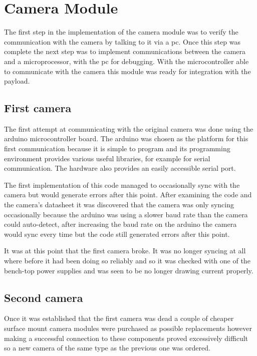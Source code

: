 \section{Camera Module}
\label{sec:John_Implementation}

The first step in the implementation of the camera module was to verify the communication with the camera by talking to it via a pc. Once this step was complete the next step was to implement communications between the camera and a microprocessor, with the pc for debugging. With the microcontroller able to communicate with the camera this module was ready for integration with the payload.

\subsection{First camera}

The first attempt at communicating with the original camera was done using the arduino microcontroller board. The arduino was chosen as the platform for this first communication because it is simple to program and its programming environment provides various useful libraries, for example for serial communication. The hardware also provides an easily accessible serial port.

The first implementation of this code managed to occasionally sync with the camera but would generate errors after this point. After examining the code and the camera's datasheet it was discovered that the camera was only syncing occasionally because the arduino was using a slower baud rate than the camera could auto-detect, after increasing the baud rate on the arduino the camera would sync every time but the code still generated errors after this point.

It was at this point that the first camera broke. It was no longer syncing at all where before it had been doing so reliably and so it was checked with one of the bench-top power supplies and was seen to be no longer drawing current properly.

\subsection{Second camera}

Once it was established that the first camera was dead a couple of cheaper surface mount camera modules were purchased as possible replacements however making a successful connection to these components proved excessively difficult so a new camera of the same type as the previous one was ordered.

